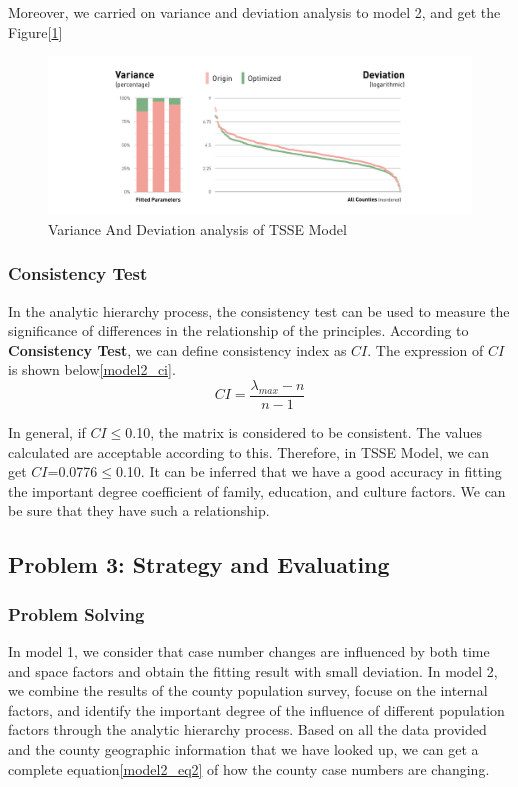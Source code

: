 \documentclass{mcmthesis}
\begin{document}
Moreover, we carried on variance and deviation analysis to model 2, and get the Figure[\ref{model2_vd}]
\begin{figure}[h]
	\centering
	\includegraphics[width=15cm]{figure-release/Model2.Evaluation.png}
	\caption{Variance And Deviation analysis of TSSE Model}\label{model2_vd}
\end{figure}


\subsubsection{Consistency Test}
In the analytic hierarchy process, the consistency test can be used to measure the significance of differences in the relationship of the principles. According to \textbf{Consistency Test}, we can define consistency index as $CI$. The expression of $CI$ is shown below\eqref{model2_ci}.
\begin{equation}
CI = \frac{\lambda_{max}-n}{n-1}
\label{model2_ci}
\end{equation}

In general, if $CI$$\le$0.10, the matrix is considered to be consistent. The values calculated are acceptable according to this.
Therefore, in TSSE Model, we can get $CI$=0.0776$\le$0.10. It can be inferred that we have a good accuracy in fitting the important degree coefficient of family, education, and culture factors. We can be sure that they have such a relationship.


\subsection{Problem 3: Strategy and Evaluating}
\subsubsection{Problem Solving}
In model 1, we consider that case number changes are influenced by both time and space factors and obtain the fitting result with small deviation. In model 2, we combine the results of the county population survey, focuse on the internal factors, and identify the important degree of the influence of different population factors through the analytic hierarchy process. Based on all the data provided and the county geographic information that we have looked up, we can get a complete equation\eqref{model2_eq2} of how the county case numbers are changing.
\end{document}
